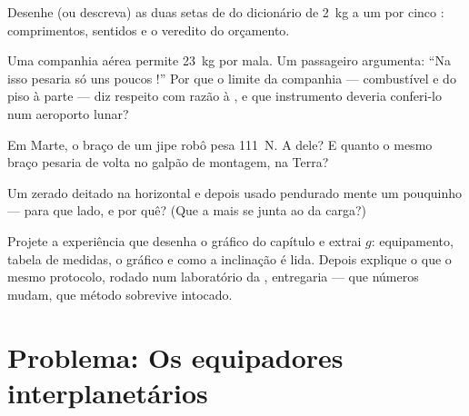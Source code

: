 \begin{exercise}[$\star$]\label{exo:g9:weight-vs-mass:8}
Desenhe (ou descreva) as duas setas de  do dicionário de
\qty{2}{kg} a um  por cinco : comprimentos,
sentidos e o veredito do orçamento.
\end{exercise}

\begin{exercise}[$\star\star$]\label{exo:g9:weight-vs-mass:9}
Uma companhia aérea permite \qty{23}{kg} por mala. Um passageiro
argumenta: ``Na  isso pesaria só uns poucos !'' Por que o
limite da companhia --- combustível e  do piso à parte ---
diz respeito com razão à , e que instrumento deveria conferi-lo
num aeroporto lunar?
\end{exercise}

\begin{exercise}[$\star\star$]\label{exo:g9:weight-vs-mass:10}
Em Marte, o braço de um jipe robô pesa \qty{111}{N}. A  dele? E
quanto o mesmo braço pesaria de volta no galpão de montagem, na
Terra?
\end{exercise}

\begin{exercise}[$\star\star$]\label{exo:g9:weight-vs-mass:11}
Um  zerado deitado na horizontal e depois usado pendurado
mente um pouquinho --- para que lado, e por quê? (Que  a mais se
junta ao da carga?)
\end{exercise}

\begin{exercise}[$\star\star\star$]\label{exo:g9:weight-vs-mass:12}
Projete a experiência que desenha o gráfico do capítulo e extrai $g$:
equipamento, tabela de medidas, o gráfico e como a inclinação é lida.
Depois explique o que o mesmo protocolo, rodado num laboratório da
, entregaria --- que números mudam, que método sobrevive intocado.
\end{exercise}

\section{Problema: Os equipadores interplanetários}

